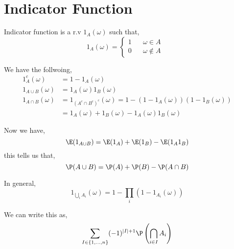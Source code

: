 \section{Indicator Function}
\begin{definition}
	Indicator function is a r.v $1_A(\omega)$ such that, $$
		1_A(\omega) = \begin{cases} 1 \quad \text{ $\omega \in A$ } \\
 			0 \quad \text{ $\omega  \not \in A$ }
		\end{cases}
	$$ 
\end{definition}

We have the follwoing,
\begin{align*}
	1_A^{c} (\omega) &= 1 - 1_A(\omega)\\
	1_{A \cup B}(\omega) &= 1_{A}(\omega) 1_B(\omega)\\
	1_{A \cap B}(\omega) &= 	1_{(A^{c} \cap B^{c})^{c}}(\omega) = 1 -(1 - 1_A(\omega))(1 - 1_B(\omega))\\
			     &= 1_A(\omega) + 1_B(\omega) - 1_A(\omega) 1_B(\omega)
\end{align*}

Now we have,
$$
\E(1_{A \cup B}) = \E(1_A) + \E(1_B) - \E(1_A 1_B)
$$
this tells us that, $$
	\P(A \cup B) = \P(A) + \P(B) - \P(A \cap B)
$$

In general, $$
1_{\bigcup_i A_i}(\omega) = 1 - \prod_i (1 - 1_A_i(\omega))
$$

We can write this as, 
$$
\sum_{I \in \{1, \dots, n\}} (-1)^{|I| + 1}  \P \left ( \bigcap_{i \in I} A_i \right )
$$
	


